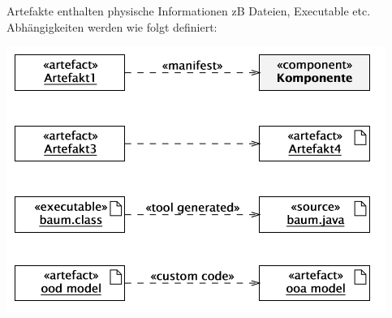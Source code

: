 Artefakte enthalten physische Informationen zB Dateien, Executable etc. Abhängigkeiten werden wie folgt definiert:
\begin{center}
	\includegraphics[width=\columnwidth]{Images/artefakte}
\end{center}

